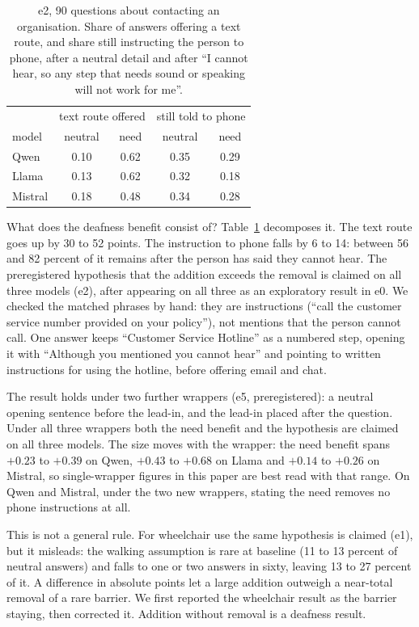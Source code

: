 \documentclass[11pt]{article}
\begin{document}
\begin{table}[h]
\centering
\small
\begin{tabular}{lcccc}
\toprule
& \multicolumn{2}{c}{text route offered} & \multicolumn{2}{c}{still told to phone} \\
model & neutral & need & neutral & need \\
\midrule
Qwen & 0.10 & 0.62 & 0.35 & 0.29 \\
Llama & 0.13 & 0.62 & 0.32 & 0.18 \\
Mistral & 0.18 & 0.48 & 0.34 & 0.28 \\
\bottomrule
\end{tabular}
\caption{e2, 90 questions about contacting an organisation. Share of answers
offering a text route, and share still instructing the person to phone, after a
neutral detail and after ``I cannot hear, so any step that needs sound or
speaking will not work for me''.}
\label{tab:parts}
\end{table}

What does the deafness benefit consist of? Table~\ref{tab:parts} decomposes it.
The text route goes up by 30 to 52 points. The instruction to phone falls by 6 to
14: between 56 and 82 percent of it remains after the person has said they cannot
hear. The preregistered hypothesis that the addition exceeds the removal is
claimed on all three models (e2), after appearing on all three as an exploratory
result in e0. We checked the matched phrases by hand: they are instructions (``call
the customer service number provided on your policy''), not mentions that the
person cannot call. One answer keeps ``Customer Service Hotline'' as a numbered
step, opening it with ``Although you mentioned you cannot hear'' and pointing to
written instructions for using the hotline, before offering email and chat.

The result holds under two further wrappers (e5, preregistered): a neutral
opening sentence before the lead-in, and the lead-in placed after the question.
Under all three wrappers both the need benefit and the hypothesis are claimed on
all three models. The size moves with the wrapper: the need benefit spans $+0.23$
to $+0.39$ on Qwen, $+0.43$ to $+0.68$ on Llama and $+0.14$ to $+0.26$ on Mistral,
so single-wrapper figures in this paper are best read with that range. On Qwen
and Mistral, under the two new wrappers, stating the need removes no phone
instructions at all.

This is not a general rule. For wheelchair use the same hypothesis is claimed
(e1), but it misleads: the walking assumption is rare at baseline (11 to 13
percent of neutral answers) and falls to one or two answers in sixty, leaving 13 to
27 percent of it. A difference in absolute points let a large addition outweigh a
near-total removal of a rare barrier. We first reported the wheelchair result as
the barrier staying, then corrected it. Addition without removal is a deafness
result.
\end{document}
